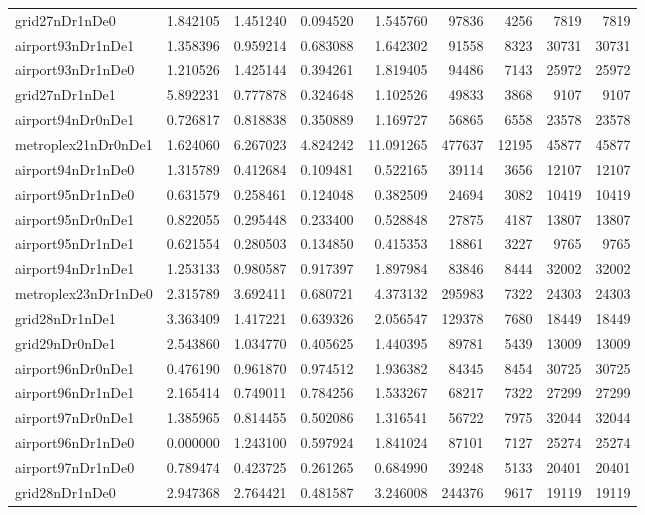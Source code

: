 \begin{longtable}{|l|r|r|r|r|r|r|r|r|}
grid27nDr1nDe0 & 1.842105 & 1.451240 & 0.094520 & 1.545760 & 97836 & 4256 & 7819 & 7819 \\
airport93nDr1nDe1 & 1.358396 & 0.959214 & 0.683088 & 1.642302 & 91558 & 8323 & 30731 & 30731 \\
airport93nDr1nDe0 & 1.210526 & 1.425144 & 0.394261 & 1.819405 & 94486 & 7143 & 25972 & 25972 \\
grid27nDr1nDe1 & 5.892231 & 0.777878 & 0.324648 & 1.102526 & 49833 & 3868 & 9107 & 9107 \\
airport94nDr0nDe1 & 0.726817 & 0.818838 & 0.350889 & 1.169727 & 56865 & 6558 & 23578 & 23578 \\
metroplex21nDr0nDe1 & 1.624060 & 6.267023 & 4.824242 & 11.091265 & 477637 & 12195 & 45877 & 45877 \\
airport94nDr1nDe0 & 1.315789 & 0.412684 & 0.109481 & 0.522165 & 39114 & 3656 & 12107 & 12107 \\
airport95nDr1nDe0 & 0.631579 & 0.258461 & 0.124048 & 0.382509 & 24694 & 3082 & 10419 & 10419 \\
airport95nDr0nDe1 & 0.822055 & 0.295448 & 0.233400 & 0.528848 & 27875 & 4187 & 13807 & 13807 \\
airport95nDr1nDe1 & 0.621554 & 0.280503 & 0.134850 & 0.415353 & 18861 & 3227 & 9765 & 9765 \\
airport94nDr1nDe1 & 1.253133 & 0.980587 & 0.917397 & 1.897984 & 83846 & 8444 & 32002 & 32002 \\
metroplex23nDr1nDe0 & 2.315789 & 3.692411 & 0.680721 & 4.373132 & 295983 & 7322 & 24303 & 24303 \\
grid28nDr1nDe1 & 3.363409 & 1.417221 & 0.639326 & 2.056547 & 129378 & 7680 & 18449 & 18449 \\
grid29nDr0nDe1 & 2.543860 & 1.034770 & 0.405625 & 1.440395 & 89781 & 5439 & 13009 & 13009 \\
airport96nDr0nDe1 & 0.476190 & 0.961870 & 0.974512 & 1.936382 & 84345 & 8454 & 30725 & 30725 \\
airport96nDr1nDe1 & 2.165414 & 0.749011 & 0.784256 & 1.533267 & 68217 & 7322 & 27299 & 27299 \\
airport97nDr0nDe1 & 1.385965 & 0.814455 & 0.502086 & 1.316541 & 56722 & 7975 & 32044 & 32044 \\
airport96nDr1nDe0 & 0.000000 & 1.243100 & 0.597924 & 1.841024 & 87101 & 7127 & 25274 & 25274 \\
airport97nDr1nDe0 & 0.789474 & 0.423725 & 0.261265 & 0.684990 & 39248 & 5133 & 20401 & 20401 \\
grid28nDr1nDe0 & 2.947368 & 2.764421 & 0.481587 & 3.246008 & 244376 & 9617 & 19119 & 19119 \\

\end{longtable}
